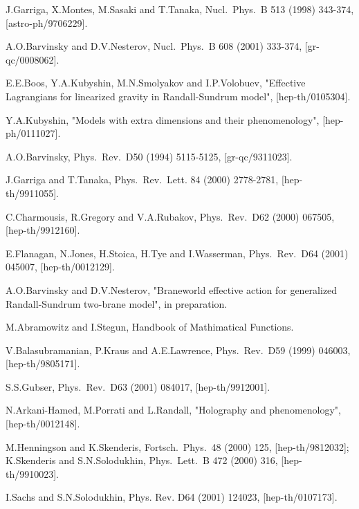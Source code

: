 \documentclass[a4paper,12pt]{article}
\begin{document}
\begin{thebibliography}{99}
J.Garriga, X.Montes, M.Sasaki and T.Tanaka,
 Nucl.\ Phys.\ B {513} (1998) 343-374, [astro-ph/9706229].

A.O.Barvinsky and D.V.Nesterov,
 Nucl.\ Phys.\ B {608} (2001) 333-374, [gr-qc/0008062].

E.E.Boos, Y.A.Kubyshin, M.N.Smolyakov and I.P.Volobuev,
 "Effective Lagrangians for linearized gravity in Randall-Sundrum model",
 [hep-th/0105304].

Y.A.Kubyshin,
 "Models with extra dimensions and their phenomenology",
 [hep-ph/0111027].

A.O.Barvinsky,
 Phys.\ Rev.\ D{50} (1994) 5115-5125, [gr-qc/9311023].


J.Garriga and T.Tanaka,
 Phys.\ Rev.\ Lett. 84 (2000) 2778-2781, [hep-th/9911055].

C.Charmousis, R.Gregory and V.A.Rubakov,
 Phys.\ Rev.\ D{62} (2000) 067505, [hep-th/9912160].

E.Flanagan, N.Jones, H.Stoica, H.Tye and I.Wasserman,
 Phys.\ Rev.\ D{64} (2001) 045007, [hep-th/0012129].


A.O.Barvinsky and D.V.Nesterov,
 "Braneworld effective action for generalized Randall-Sundrum
 two-brane model", in preparation.

M.Abramowitz and I.Stegun,
 Handbook of Mathimatical Functions.

V.Balasubramanian, P.Kraus and A.E.Lawrence,
 Phys.\ Rev.\ D{59} (1999) 046003, [hep-th/9805171].

S.S.Gubser,
 Phys.\ Rev.\ D{63} (2001) 084017, [hep-th/9912001].

N.Arkani-Hamed, M.Porrati and L.Randall,
 "Holography and phenomenology", [hep-th/0012148].


M.Henningson and K.Skenderis,
 Fortsch.\ Phys.\ {48} (2000) 125, [hep-th/9812032];
 K.Skenderis and S.N.Solodukhin,
 Phys.\ Lett.\ B {472} (2000) 316, [hep-th/9910023].

I.Sachs and S.N.Solodukhin,
 Phys. Rev. D{64} (2001) 124023, [hep-th/0107173].


\end{thebibliography}
\end{document}
